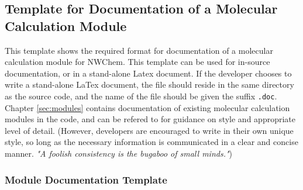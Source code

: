 \subsection{Template for Documentation of a Molecular Calculation Module}

This template shows the required format for documentation of a molecular
calculation module for NWChem.  This template can be used for in-source
documentation, or in a stand-alone Latex document.  If the developer chooses to write
a stand-alone LaTex document, the file should reside in the same directory as
the source code, and the name of the file should be given the suffix
{\tt .doc}.  Chapter \ref{sec:modules} contains documentation of existing
molecular calculation modules in the code, and can be refered to for guidance
on style and appropriate level of detail.  (However, developers are encouraged
to write in their own unique style, so long as the necessary information is
communicated in a clear and concise manner.  {\em "A foolish consistency is the bugaboo 
of small minds."})

\subsubsection{Module Documentation Template}

